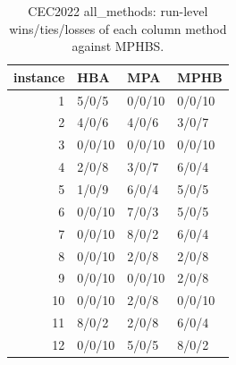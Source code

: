 \begin{table}[t]
\centering
\scriptsize
\caption{CEC2022 all_methods: run-level wins/ties/losses of each column method against MPHBS.}
\label{tab:cec2022_all_methods_wtl}
\begin{tabular}{rlll}
\toprule
instance & HBA & MPA & MPHB \\
\midrule
1 & 5/0/5 & 0/0/10 & 0/0/10 \\
2 & 4/0/6 & 4/0/6 & 3/0/7 \\
3 & 0/0/10 & 0/0/10 & 0/0/10 \\
4 & 2/0/8 & 3/0/7 & 6/0/4 \\
5 & 1/0/9 & 6/0/4 & 5/0/5 \\
6 & 0/0/10 & 7/0/3 & 5/0/5 \\
7 & 0/0/10 & 8/0/2 & 6/0/4 \\
8 & 0/0/10 & 2/0/8 & 2/0/8 \\
9 & 0/0/10 & 0/0/10 & 2/0/8 \\
10 & 0/0/10 & 2/0/8 & 0/0/10 \\
11 & 8/0/2 & 2/0/8 & 6/0/4 \\
12 & 0/0/10 & 5/0/5 & 8/0/2 \\
\bottomrule
\end{tabular}
\end{table}
